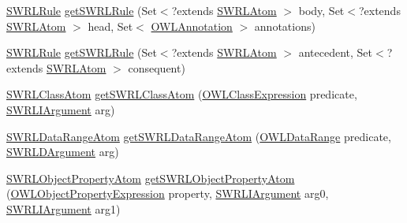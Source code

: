 \begin{DoxyCompactItemize}
\item 
\hyperlink{interfaceorg_1_1semanticweb_1_1owlapi_1_1model_1_1_s_w_r_l_rule}{S\-W\-R\-L\-Rule} \hyperlink{classuk_1_1ac_1_1manchester_1_1cs_1_1owl_1_1owlapi_1_1_o_w_l_data_factory_impl_ab43cef10de253252a8a882926330d6a9}{get\-S\-W\-R\-L\-Rule} (Set$<$?extends \hyperlink{interfaceorg_1_1semanticweb_1_1owlapi_1_1model_1_1_s_w_r_l_atom}{S\-W\-R\-L\-Atom} $>$ body, Set$<$?extends \hyperlink{interfaceorg_1_1semanticweb_1_1owlapi_1_1model_1_1_s_w_r_l_atom}{S\-W\-R\-L\-Atom} $>$ head, Set$<$ \hyperlink{interfaceorg_1_1semanticweb_1_1owlapi_1_1model_1_1_o_w_l_annotation}{O\-W\-L\-Annotation} $>$ annotations)
\item 
\hyperlink{interfaceorg_1_1semanticweb_1_1owlapi_1_1model_1_1_s_w_r_l_rule}{S\-W\-R\-L\-Rule} \hyperlink{classuk_1_1ac_1_1manchester_1_1cs_1_1owl_1_1owlapi_1_1_o_w_l_data_factory_impl_ab674cccabf932cc23d7aaea8690ed832}{get\-S\-W\-R\-L\-Rule} (Set$<$?extends \hyperlink{interfaceorg_1_1semanticweb_1_1owlapi_1_1model_1_1_s_w_r_l_atom}{S\-W\-R\-L\-Atom} $>$ antecedent, Set$<$?extends \hyperlink{interfaceorg_1_1semanticweb_1_1owlapi_1_1model_1_1_s_w_r_l_atom}{S\-W\-R\-L\-Atom} $>$ consequent)
\item 
\hyperlink{interfaceorg_1_1semanticweb_1_1owlapi_1_1model_1_1_s_w_r_l_class_atom}{S\-W\-R\-L\-Class\-Atom} \hyperlink{classuk_1_1ac_1_1manchester_1_1cs_1_1owl_1_1owlapi_1_1_o_w_l_data_factory_impl_a30056012435c15e4c2b06bfb366ba8d4}{get\-S\-W\-R\-L\-Class\-Atom} (\hyperlink{interfaceorg_1_1semanticweb_1_1owlapi_1_1model_1_1_o_w_l_class_expression}{O\-W\-L\-Class\-Expression} predicate, \hyperlink{interfaceorg_1_1semanticweb_1_1owlapi_1_1model_1_1_s_w_r_l_i_argument}{S\-W\-R\-L\-I\-Argument} arg)
\item 
\hyperlink{interfaceorg_1_1semanticweb_1_1owlapi_1_1model_1_1_s_w_r_l_data_range_atom}{S\-W\-R\-L\-Data\-Range\-Atom} \hyperlink{classuk_1_1ac_1_1manchester_1_1cs_1_1owl_1_1owlapi_1_1_o_w_l_data_factory_impl_a06c4e9b9510c079598ccdb40f7d963f4}{get\-S\-W\-R\-L\-Data\-Range\-Atom} (\hyperlink{interfaceorg_1_1semanticweb_1_1owlapi_1_1model_1_1_o_w_l_data_range}{O\-W\-L\-Data\-Range} predicate, \hyperlink{interfaceorg_1_1semanticweb_1_1owlapi_1_1model_1_1_s_w_r_l_d_argument}{S\-W\-R\-L\-D\-Argument} arg)
\item 
\hyperlink{interfaceorg_1_1semanticweb_1_1owlapi_1_1model_1_1_s_w_r_l_object_property_atom}{S\-W\-R\-L\-Object\-Property\-Atom} \hyperlink{classuk_1_1ac_1_1manchester_1_1cs_1_1owl_1_1owlapi_1_1_o_w_l_data_factory_impl_ac4818d6750457ce5b21e7f603674a12f}{get\-S\-W\-R\-L\-Object\-Property\-Atom} (\hyperlink{interfaceorg_1_1semanticweb_1_1owlapi_1_1model_1_1_o_w_l_object_property_expression}{O\-W\-L\-Object\-Property\-Expression} property, \hyperlink{interfaceorg_1_1semanticweb_1_1owlapi_1_1model_1_1_s_w_r_l_i_argument}{S\-W\-R\-L\-I\-Argument} arg0, \hyperlink{interfaceorg_1_1semanticweb_1_1owlapi_1_1model_1_1_s_w_r_l_i_argument}{S\-W\-R\-L\-I\-Argument} arg1)

\end{DoxyCompactItemize}
